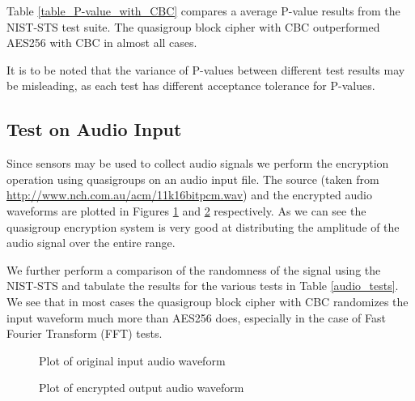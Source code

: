 \documentclass[conference]{IEEEtran}
\begin{document}
Table \ref{table_P-value_with_CBC} compares a average P-value results from the NIST-STS test suite. The quasigroup block cipher with CBC outperformed AES256 with CBC in almost all cases.

It is to be noted that the variance of P-values between different test results may be misleading, as each test has different acceptance tolerance for P-values.

\subsection{Test on Audio Input}
Since sensors may be used to collect audio signals we perform the encryption operation using quasigroups on an audio input file. The source (taken from \url{http://www.nch.com.au/acm/11k16bitpcm.wav}) and the encrypted audio waveforms are plotted in Figures \ref{fig:audioWaves} and \ref{fig:audioEnc} respectively. As we can see the quasigroup encryption system is very good at distributing the amplitude of the audio signal over the entire range.

We further perform a comparison of the randomness of the signal using the NIST-STS and tabulate the results for the various tests in Table \ref{audio_tests}. We see that in most cases the quasigroup block cipher with CBC randomizes the input waveform much more than AES256 does, especially in the case of Fast Fourier Transform (FFT) tests.

\begin{figure}[!ht]
\centering
{}
\caption{Plot of original input audio waveform}
\label{fig:audioWaves}
\end{figure}

\begin{figure}[!ht]
\centering
{}
\caption{Plot of encrypted output audio waveform}
\label{fig:audioEnc}
\end{figure}
\end{document}
